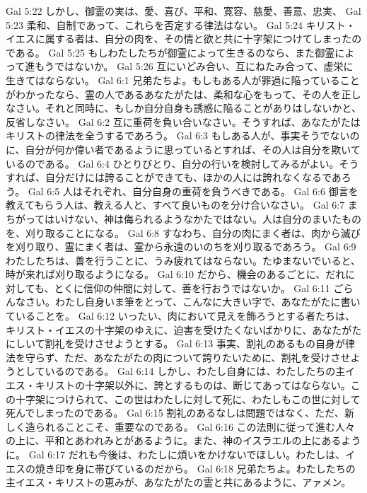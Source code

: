 Gal 5:22  しかし、御霊の実は、愛、喜び、平和、寛容、慈愛、善意、忠実、
Gal 5:23  柔和、自制であって、これらを否定する律法はない。
Gal 5:24  キリスト・イエスに属する者は、自分の肉を、その情と欲と共に十字架につけてしまったのである。
Gal 5:25  もしわたしたちが御霊によって生きるのなら、また御霊によって進もうではないか。
Gal 5:26  互にいどみ合い、互にねたみ合って、虚栄に生きてはならない。
Gal 6:1  兄弟たちよ。もしもある人が罪過に陥っていることがわかったなら、霊の人であるあなたがたは、柔和な心をもって、その人を正しなさい。それと同時に、もしか自分自身も誘惑に陥ることがありはしないかと、反省しなさい。
Gal 6:2  互に重荷を負い合いなさい。そうすれば、あなたがたはキリストの律法を全うするであろう。
Gal 6:3  もしある人が、事実そうでないのに、自分が何か偉い者であるように思っているとすれば、その人は自分を欺いているのである。
Gal 6:4  ひとりびとり、自分の行いを検討してみるがよい。そうすれば、自分だけには誇ることができても、ほかの人には誇れなくなるであろう。
Gal 6:5  人はそれぞれ、自分自身の重荷を負うべきである。
Gal 6:6  御言を教えてもらう人は、教える人と、すべて良いものを分け合いなさい。
Gal 6:7  まちがってはいけない、神は侮られるようなかたではない。人は自分のまいたものを、刈り取ることになる。
Gal 6:8  すなわち、自分の肉にまく者は、肉から滅びを刈り取り、霊にまく者は、霊から永遠のいのちを刈り取るであろう。
Gal 6:9  わたしたちは、善を行うことに、うみ疲れてはならない。たゆまないでいると、時が来れば刈り取るようになる。
Gal 6:10  だから、機会のあるごとに、だれに対しても、とくに信仰の仲間に対して、善を行おうではないか。
Gal 6:11  ごらんなさい。わたし自身いま筆をとって、こんなに大きい字で、あなたがたに書いていることを。
Gal 6:12  いったい、肉において見えを飾ろうとする者たちは、キリスト・イエスの十字架のゆえに、迫害を受けたくないばかりに、あなたがたにしいて割礼を受けさせようとする。
Gal 6:13  事実、割礼のあるもの自身が律法を守らず、ただ、あなたがたの肉について誇りたいために、割礼を受けさせようとしているのである。
Gal 6:14  しかし、わたし自身には、わたしたちの主イエス・キリストの十字架以外に、誇とするものは、断じてあってはならない。この十字架につけられて、この世はわたしに対して死に、わたしもこの世に対して死んでしまったのである。
Gal 6:15  割礼のあるなしは問題ではなく、ただ、新しく造られることこそ、重要なのである。
Gal 6:16  この法則に従って進む人々の上に、平和とあわれみとがあるように。また、神のイスラエルの上にあるように。
Gal 6:17  だれも今後は、わたしに煩いをかけないでほしい。わたしは、イエスの焼き印を身に帯びているのだから。
Gal 6:18  兄弟たちよ。わたしたちの主イエス・キリストの恵みが、あなたがたの霊と共にあるように、アァメン。


